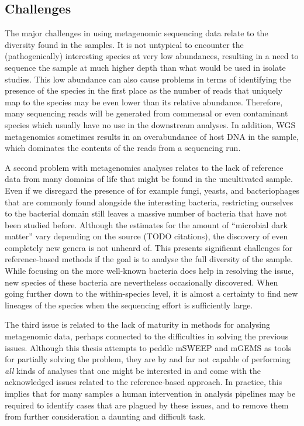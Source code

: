 \documentclass[officiallayout]{tktla}
\begin{document}
\subsection{Challenges}
The major challenges in using metagenomic sequencing data relate to
the diversity found in the samples. It is not untypical to encounter
the (pathogenically) interesting species at very low abundances,
resulting in a need to sequence the sample at much higher depth than
what would be used in isolate studies. This low abundance can also
cause problems in terms of identifying the presence of the species in
the first place as the number of reads that uniquely map to the
species may be even lower than its relative abundance. Therefore, many
sequencing reads will be generated from commensal or even contaminant
species which usually have no use in the downstream analyses. In
addition, WGS metagenomics sometimes results in an overabundance of
host DNA in the sample, which dominates the contents of the reads from
a sequencing run.

A second problem with metagenomics analyses relates to the lack of
reference data from many domains of life that might be found in the
uncultivated sample. Even if we disregard the presence of for example
fungi, yeasts, and bacteriophages that are commonly found alongside
the interesting bacteria, restricting ourselves to the bacterial
domain still leaves a massive number of bacteria that have not been
studied before. Although the estimates for the amount of ``microbial
dark matter'' vary depending on the source (TODO citations), the
discovery of even completely new genera is not unheard of. This
presents significant challenges for reference-based methods if the
goal is to analyse the full diversity of the sample. While focusing on
the more well-known bacteria does help in resolving the issue, new
species of these bacteria are nevertheless occasionally
discovered. When going further down to the within-species level, it is
almost a certainty to find new lineages of the species when the
sequencing effort is sufficiently large.

The third issue is related to the lack of maturity in methods for
analysing metagenomic data, perhaps connected to the difficulties in
solving the previous issues. Although this thesis attempts to peddle
mSWEEP and mGEMS as tools for partially solving the problem, they are
by and far not capable of performing \textit{all} kinds of analyses
that one might be interested in and come with the acknowledged issues
related to the reference-based approach. In practice, this implies
that for many samples a human intervention in analysis pipelines may
be required to identify cases that are plagued by these issues, and to
remove them from further consideration \textemdash{ }  a daunting and
difficult task.
\end{document}

